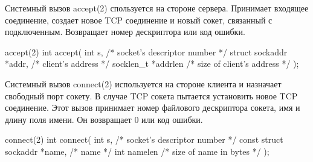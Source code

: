 Системный вызов accept(2) спользуется на стороне сервера. Принимает входящее соединение, создает новое TCP соединение и новый сокет, связанный с подключенным. Возвращает номер дескриптора или код ошибки.

\begin{CCode}{accept(2)}
	int accept( 
		int s, 					/* socket's descriptor number */ 
		struct sockaddr *addr,	/* client's address */ 
		socklen_t *addrlen 		/* size of client's address */ 
	); \end{CCode} 


Системный вызов connect(2) используется на стороне клиента и назначает свободный порт сокету. В случае TCP сокета пытается установить новое TCP соединение. Этот вызов принимает номер файлового дескриптора сокета, имя и длину поля имени. Он возвращает 0 или код ошибки.

\begin{CCode}{connect(2)}
	int connect( 
		int s,							/* socket's descriptor number */ 
		const struct sockaddr *name, 	/* name */ 
		int namelen 					/* size of name in bytes */ 
	); \end{CCode} 
